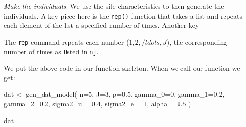 \documentclass[
]{book}
\newenvironment{Shaded}{\begin{snugshade}}{\end{snugshade}}
\newcommand{\AttributeTok}[1]{\textcolor[rgb]{0.77,0.63,0.00}{#1}}
\newcommand{\CommentTok}[1]{\textcolor[rgb]{0.56,0.35,0.01}{\textit{#1}}}
\newcommand{\DecValTok}[1]{\textcolor[rgb]{0.00,0.00,0.81}{#1}}
\newcommand{\FloatTok}[1]{\textcolor[rgb]{0.00,0.00,0.81}{#1}}
\newcommand{\FunctionTok}[1]{\textcolor[rgb]{0.00,0.00,0.00}{#1}}
\newcommand{\NormalTok}[1]{#1}
\newcommand{\OtherTok}[1]{\textcolor[rgb]{0.56,0.35,0.01}{#1}}
\newcommand{\SpecialCharTok}[1]{\textcolor[rgb]{0.00,0.00,0.00}{#1}}
\begin{document}
\emph{Make the individuals.}
We use the site characteristics to then generate the individuals.
A key piece here is the \texttt{rep()} function that takes a list and repeats each element of the list a specified number of times.
Another key

\begin{Shaded}
\end{Shaded}

The \texttt{rep} command repeats each number (\(1, 2, /ldots,J\)), the corresponding number of times as listed in \texttt{nj}.

We put the above code in our function skeleton.
When we call our function we get:

\begin{Shaded}
\begin{Highlighting}[]
\NormalTok{dat }\OtherTok{\textless{}{-}} \FunctionTok{gen\_dat\_model}\NormalTok{( }\AttributeTok{n=}\DecValTok{5}\NormalTok{, }\AttributeTok{J=}\DecValTok{3}\NormalTok{, }\AttributeTok{p=}\FloatTok{0.5}\NormalTok{, }
                        \AttributeTok{gamma\_0=}\DecValTok{0}\NormalTok{, }\AttributeTok{gamma\_1=}\FloatTok{0.2}\NormalTok{, }\AttributeTok{gamma\_2=}\FloatTok{0.2}\NormalTok{,}
                        \AttributeTok{sigma2\_u =} \FloatTok{0.4}\NormalTok{, }\AttributeTok{sigma2\_e =} \DecValTok{1}\NormalTok{,}
                      \AttributeTok{alpha =} \FloatTok{0.5}\NormalTok{ )}

\NormalTok{dat}
\end{Highlighting}
\end{Shaded}
\end{document}
